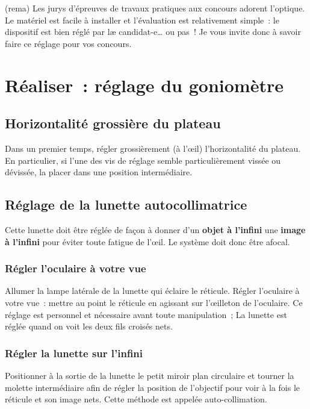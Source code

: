 \documentclass[../main/main.tex]{subfiles}
\begin{document}
\begin{tcb}(rema){}
  Les jurys d'épreuves de travaux pratiques aux concours adorent l'optique. Le
  matériel est facile à installer et l'évaluation est relativement simple~: le
  dispositif est bien réglé par læ candidat-e… ou pas~! Je vous invite donc à
  savoir faire ce réglage pour vos concours.
\end{tcb}

\section{Réaliser~: réglage du goniomètre}

\subsection{Horizontalité grossière du plateau}

Dans un premier temps, régler grossièrement (à l'œil) l'horizontalité du
plateau. En particulier, si l'une des vis de réglage semble particulièrement
vissée ou dévissée, la placer dans une position intermédiaire. 

\subsection{Réglage de la lunette autocollimatrice}

Cette lunette doit être réglée de façon à donner d'un \textbf{objet à l'infini}
une \textbf{image à l'infini} pour éviter toute fatigue de l'œil. Le système
doit donc être afocal.

\subsubsection{Régler l'oculaire à votre vue}

Allumer la lampe latérale de la lunette qui éclaire le réticule.
Régler l'oculaire à votre vue~: mettre au point le réticule en agissant sur
l'œilleton de l'oculaire. Ce réglage est personnel et nécessaire avant toute
manipulation~; La lunette est réglée quand on voit les deux fils croisés nets.


\subsubsection{Régler la lunette sur l'infini}

Positionner à la sortie de la lunette le petit miroir plan circulaire et tourner
la molette intermédiaire afin de régler la position de l'objectif  pour voir à
la fois le réticule et son image nets. Cette méthode est appelée
auto-collimation. 
\end{document}
